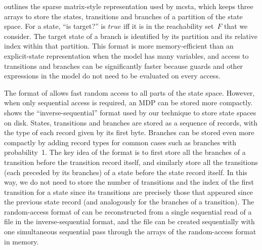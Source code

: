 \documentclass{llncs}
\newcommand{\mcsta}{\textsf{\mbox{mcsta}}\xspace}
\newcommand{\True}[0]{\ensuremath{\mathit{true}}\xspace}
\begin{document}
 outlines the sparse matrix-style representation used by \mcsta, which keeps three arrays to store the states, transitions and branches of a partition of the state space.
For a state, ``is target?'' is \True iff it is in the reachability set~$F$ that we consider.
The target state of a branch is identified by its partition and its relative index within that partition.
This format is more memory-efficient than an explicit-state representation when the model has many variables, and access to transitions and branches can be significantly faster because guards and other expressions in the model do not need to be evaluated on every access.

The format of  allows fast random access to all parts of the state space.
However, when only sequential access is required, an MDP can be stored more compactly.
 shows the ``inverse-sequential'' format used by our technique to store state spaces on disk.
States, transitions and branches are stored as a sequence of records, with the type of each record given by its first byte.
Branches can be stored even more compactly by adding record types for common cases such as branches with probability~1.
The key idea of the format is to first store all the branches of a transition before the transition record itself, and similarly store all the transitions (each preceded by its branches) of a state before the state record itself.
In this way, we do not need to store the number of transitions and the index of the first transition for a state since its transitions are precisely those that appeared since the previous state record (and analogously for the branches of a transition).
The random-access format of  can be reconstructed from a single sequential read of a file in the inverse-sequential format, and the file can be created sequentially with one simultaneous sequential pass through the arrays of the random-access format in memory.
\end{document}
